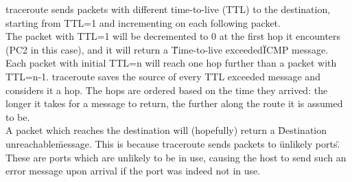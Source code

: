 traceroute sends packets with different time-to-live (TTL) to the destination, starting from TTL=1 and incrementing on each following packet. \\
The packet with TTL=1 will be decremented to 0 at the first hop it encounters (PC2 in this case), and it will return a \"Time-to-live exceeded\" ICMP message. \\
Each packet with initial TTL=n will reach one hop further than a packet with TTL=n-1. traceroute saves the source of every TTL exceeded message and considers it a hop. The hops are ordered based on the time they arrived: the longer it takes for a message to return, the further along the route it is assumed to be.\\
A packet which reaches the destination will (hopefully) return a \"Destination unreachable\" message. This is because traceroute sends packets to \"unlikely ports\". These are ports which are unlikely to be in use, causing the host to send such an error message upon arrival if the port was indeed not in use.
